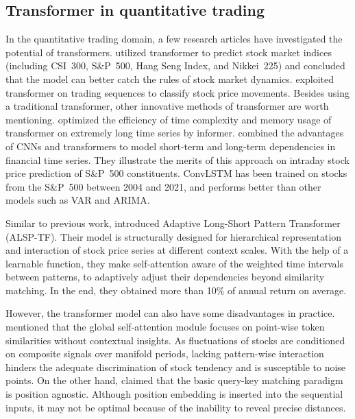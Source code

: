 \documentclass[preprint,12pt]{elsarticle}
\begin{document}
\subsection{Transformer in quantitative trading}
In the quantitative trading domain, a few research articles have investigated the potential of transformers. \citet{wang2022stock} utilized transformer to predict stock market indices (including CSI~300, S\&P~500, Hang Seng Index, and Nikkei~225) and concluded that the model can better catch the rules of stock market dynamics. \citet{ding2020hierarchical} exploited transformer on trading sequences to classify stock price movements. Besides using a traditional transformer, other innovative methods of transformer are worth mentioning. 
\citet{zhou2021informer} optimized the efficiency of time complexity and memory usage of transformer on extremely long time series by informer. 
\citet{zeng2023financial} combined the advantages of CNNs and transformers to model short-term and long-term dependencies in financial time series. They illustrate the merits of this approach on intraday stock price prediction of S\&P~500 constituents. ConvLSTM \citep{kim2024physics} has been trained on stocks from the S\&P~500 between 2004 and 2021, and performs better than other models such as VAR and ARIMA.

Similar to previous work, \citet{wang2022adaptive} introduced Adaptive Long-Short
Pattern Transformer (ALSP-TF). Their model is structurally designed for hierarchical representation and interaction of stock price series at different context scales. With the help of a learnable function, they make self-attention aware of the weighted time intervals between patterns, to adaptively adjust their dependencies beyond similarity matching. In the end, they obtained more than 10\% of annual return on average.

However, the transformer model can also have some disadvantages in practice. \citet{xu2021relation} mentioned that the global self-attention module focuses on point-wise token similarities without contextual insights. As fluctuations of stocks are conditioned on composite signals over manifold periods, lacking pattern-wise interaction hinders the adequate discrimination of stock tendency and is susceptible to noise points. On the other hand, \citet{wu2020transformer} claimed that the basic query-key matching paradigm is position agnostic. Although position embedding is inserted into the sequential inputs, it may not be optimal because of the inability to reveal precise distances.
\end{document}
